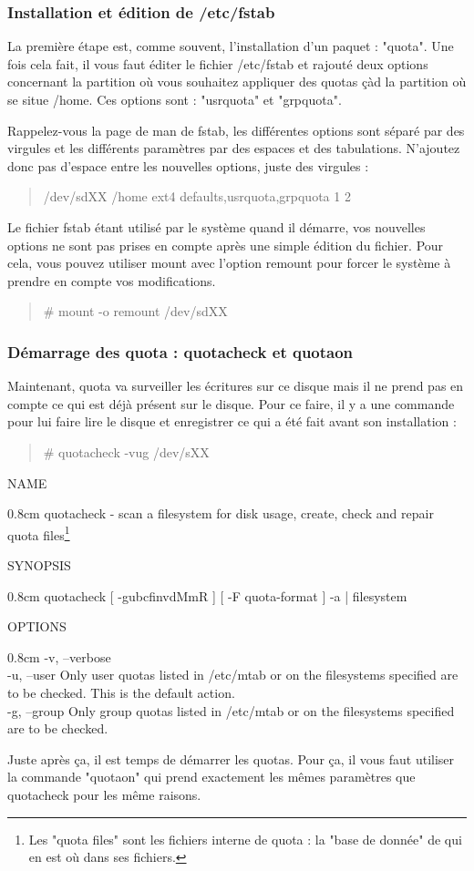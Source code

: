 \documentclass[a4paper]{article}
\newcommand{\commande}[1] {
    \begin{quote}
    \tt\raggedright #1 
    \end{quote}
}
\newcommand{\man}[2]{
    \begin{tcolorbox}[toprule=3mm,width=\textwidth,outer arc=0mm,colbacktitle=grayman,coltitle=black,colback={grayman},colframe={grayman},title={man : \tt #1}]
        \tt\raggedright #2
    \end{tcolorbox}
}
\newcommand{\mandesc}[1]{
    \begin{adjustwidth}{0.8cm}{}
        #1
    \end{adjustwidth}
}
\begin{document}
\subsubsection{Installation et édition de /etc/fstab}
\par La première étape est, comme souvent, l'installation d'un paquet : "quota". Une fois cela fait, il vous faut éditer le fichier /etc/fstab et rajouté deux options concernant la partition où vous souhaitez appliquer des quotas çàd la partition où se situe /home. Ces options sont : "usrquota" et "grpquota".
\par Rappelez-vous la page de man de fstab, les différentes options sont séparé par des virgules et les différents paramètres par des espaces et des tabulations. N'ajoutez donc pas d'espace entre les nouvelles options, juste des virgules :
\commande{/dev/sdXX /home ext4 defaults,usrquota,grpquota 1 2}
\par Le fichier fstab étant utilisé par le système quand il démarre, vos nouvelles options ne sont pas prises en compte après une simple édition du fichier. Pour cela, vous pouvez utiliser mount avec l'option remount pour forcer le système à prendre en compte vos modifications.
\commande{\# mount -o remount /dev/sdXX}

\subsubsection{Démarrage des quota : quotacheck et quotaon}
\par Maintenant, quota va surveiller les écritures sur ce disque mais il ne prend pas en compte ce qui est déjà présent sur le disque. Pour ce faire, il y a une commande pour lui faire lire le disque et enregistrer ce qui a été fait avant son installation :
\commande{\# quotacheck -vug /dev/sXX}
\man{quotacheck}{NAME
\mandesc{quotacheck - scan a filesystem for disk usage, create, check and repair quota files\footnote{Les "quota files" sont les fichiers interne de quota : la "base de donnée" de qui en est où dans ses fichiers.}}
SYNOPSIS
\mandesc{quotacheck [ -gubcfinvdMmR ] [ -F quota-format ] -a | filesystem}
OPTIONS
\mandesc{-v, --verbose\\
-u, --user Only user quotas listed in /etc/mtab or on the filesystems specified are to be checked.  This is the default action.\\
-g, --group Only group quotas listed in /etc/mtab or on the filesystems specified are to be checked.
}
}
\par Juste après ça, il est temps de démarrer les quotas. Pour ça, il vous faut utiliser la commande "quotaon" qui prend exactement les mêmes paramètres que quotacheck pour les même raisons.
\end{document}
